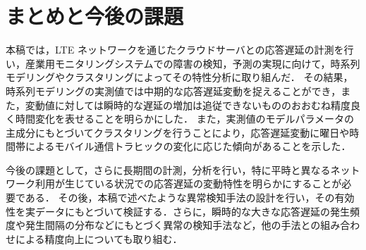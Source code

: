 \documentclass[technicalreport]{ieicej}
\begin{document}
\section{まとめと今後の課題}
本稿では，LTE ネットワークを通じたクラウドサーバとの応答遅延の計測を行い，産業用モニタリングシステムでの障害の検知，予測の実現に向けて，時系列モデリングやクラスタリングによってその特性分析に取り組んだ．
その結果，時系列モデリングの実測値では中期的な応答遅延変動を捉えることができ，また，変動値に対しては瞬時的な遅延の増加は追従できないもののおおむね精度良く時間変化を表せることを明らかにした．
また，実測値のモデルパラメータの主成分にもとづいてクラスタリングを行うことにより，応答遅延変動に曜日や時間帯によるモバイル通信トラヒックの変化に応じた傾向があることを示した．

今後の課題として，さらに長期間の計測，分析を行い，特に平時と異なるネットワーク利用が生じている状況での応答遅延の変動特性を明らかにすることが必要である．
その後，本稿で述べたような異常検知手法の設計を行い，その有効性を実データにもとづいて検証する．さらに，瞬時的な大きな応答遅延の発生頻度や発生間隔の分布などにもとづく異常の検知手法など，他の手法との組み合わせによる精度向上についても取り組む．



\end{document}
